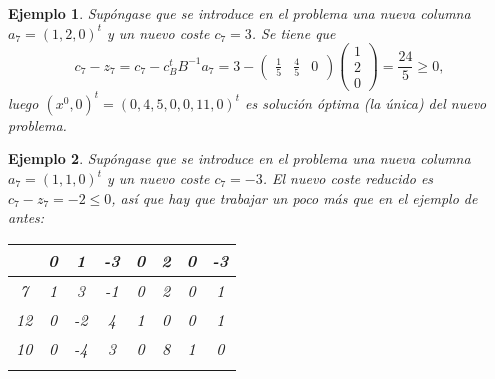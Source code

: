 \documentclass[11pt]{report}
\theoremstyle{mytheorem}
\theoremstyle{mydefinition}
\theoremstyle{myexample}
\newtheorem*{example}{Ejemplo}
\begin{document}
\begin{example}
Supóngase que se introduce en el problema una nueva columna $a_7 = (1,2,0)^t$ y un nuevo coste $c_7 = 3$. Se tiene que \[c_7-z_7 = c_7-c_B^tB^{-1}a_7 = 3- \begin{pmatrix}
    \displaystyle\frac{1}{5} & \displaystyle\frac{4}{5} & 0
\end{pmatrix}\begin{pmatrix}
    1 \\
    2 \\
    0
\end{pmatrix} = \frac{24}{5} \geq 0,\]
luego $(x^0,0)^t = (0,4,5,0,0,11,0)^t$ es solución óptima (la única) del nuevo problema.
\end{example}

\begin{example}
Supóngase que se introduce en el problema una nueva columna $a_7 = (1,1,0)^t$ y un nuevo coste $c_7 = -3$. El nuevo coste reducido es $c_7-z_7 = -2 \leq 0$, así que hay que trabajar un poco más que en el ejemplo de antes:

\begin{center}
\begin{tabular}{|c|c|c|c|c|c|c|c|}
    \cline{2-8}
    
    \multicolumn{1}{c|}{} & \multicolumn{1}{c}{\phantom{-}0} & \multicolumn{1}{c}{\phantom{-}1} & \multicolumn{1}{c}{-3} & \multicolumn{1}{c}{\phantom{-}0} & \multicolumn{1}{c}{\phantom{-}2} & \multicolumn{1}{c}{0} & \multicolumn{1}{c|}{-3} \\ \hline
    
    \phantom{-}7 & \multicolumn{1}{c}{\phantom{-}1} & \multicolumn{1}{c}{\phantom{-}3} & \multicolumn{1}{c}{-1} & \multicolumn{1}{c}{\phantom{-}0} & \multicolumn{1}{c}{\phantom{-}2} & \multicolumn{1}{c}{0} & \multicolumn{1}{c|}{\phantom{-}1} \\

    \phantom{-}12 & \multicolumn{1}{c}{\phantom{-}0} & \multicolumn{1}{c}{-2} & \multicolumn{1}{c}{\phantom{-}4} & \multicolumn{1}{c}{\phantom{-}1} & \multicolumn{1}{c}{\phantom{-}0} & \multicolumn{1}{c}{0} & \multicolumn{1}{c|}{\phantom{-}1} \\
    
    \phantom{-}10 & \multicolumn{1}{c}{\phantom{-}0} & \multicolumn{1}{c}{-4} & \multicolumn{1}{c}{\phantom{-}3} & \multicolumn{1}{c}{\phantom{-}0} & \multicolumn{1}{c}{\phantom{-}8} & \multicolumn{1}{c}{1} & \multicolumn{1}{c|}{\phantom{-}0} \\ \hhline{|=|=|=|=|=|=|=|=|}


\end{tabular}
\end{center}
\end{example}
\end{document}
